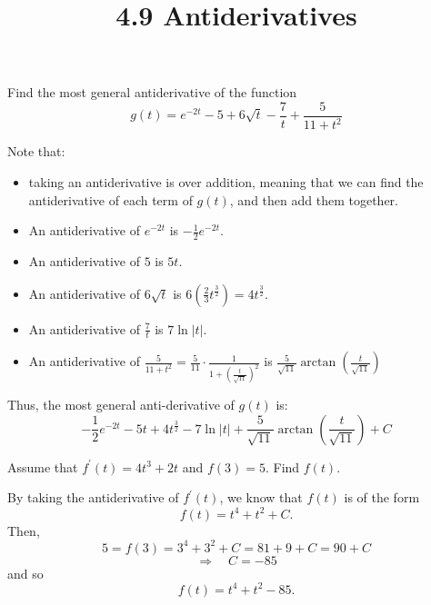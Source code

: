 \documentclass[nooutcomes]{ximera}
\title{4.9 Antiderivatives}
\begin{document}
\begin{abstract}		\end{abstract}
\maketitle



\begin{problem}
Find the most general antiderivative of the function
$$ g(t) = e^{-2t} - 5 + 6\sqrt{t}-\frac{7}{t} + \frac{5}{11 + t^2} $$
		\begin{freeResponse}
		Note that:
			\begin{itemize}
			\item  taking an antiderivative is  over addition, meaning that we can find the antiderivative of each term of $g(t)$, and then add them together.
			\item  An antiderivative of $e^{-2t}$ is $-\frac{1}{2} e^{-2t}$.
			\item  An antiderivative of $5$ is $5t$.
			\item  An antiderivative of $6 \sqrt{t}$ is $6 \left( \frac{2}{3} t^{\frac{3}{2}} \right) = 4t^{\frac{3}{2}}$.
			\item  An antiderivative of $\frac{7}{t}$ is $7 \ln |t|$.
			\item  An antiderivative of $\frac{5}{11 + t^2} = \frac{5}{11} \cdot \frac{1}{1 + \left( \frac{t}{\sqrt{11}} \right)^2 }$
			is $\frac{5}{\sqrt{11}} \arctan \left( \frac{t}{\sqrt{11}} \right)$
			\end{itemize}
		Thus, the most general anti-derivative of $g(t)$ is:
		$$ -\frac{1}{2} e^{-2t} - 5t + 4t^{\frac{3}{2}} - 7 \ln |t| + \frac{5}{\sqrt{11}} \arctan \left( \frac{t}{\sqrt{11}} \right) + C $$
		\end{freeResponse}
		
		
\end{problem}








\begin{problem}
Assume that $f^\prime (t) = 4t^3 + 2t$ and $f(3) = 5$.  Find $f(t)$.
		\begin{freeResponse}
		By taking the antiderivative of $f^\prime (t)$, we know that $f(t)$ is of the form
		$$f(t) = t^4 + t^2 + C .$$
		Then,
		$$ 5 = f(3) = 3^4 + 3^2 + C = 81 + 9 + C = 90 + C$$
		$$\Longrightarrow \quad  C = -85 $$
		and so
		$$ f(t) = t^4 + t^2 - 85. $$
		\end{freeResponse}
		
		
		

\end{problem}
	
\end{document}
